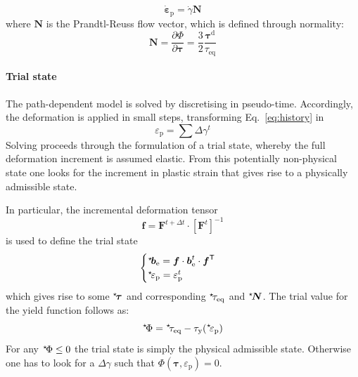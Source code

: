 \documentclass{goose-article}
\newcommand\ST[1]{\hspace*{-.3em}~^\star\!#1}
\newcommand\T[1]{\bm{{#1}}}
\begin{document}
\begin{equation}
  \dot{\bm{\varepsilon}}_\mathrm{p} = \dot{\gamma} \bm{N}
  \label{eq:flow-rule}
\end{equation}
where $\bm{N}$ is the Prandtl-Reuss flow vector, which is defined through normality:
\begin{equation}
  \bm{N}
  = \frac{\partial \Phi}{\partial \T{\tau}}
  = \frac{3}{2} \frac{\T{\tau}^\mathrm{d}}{\tau_\mathrm{eq}}
\end{equation}

\paragraph{Trial state}

The path-dependent model is solved by discretising in pseudo-time. Accordingly, the deformation is applied in small steps, transforming Eq.~\eqref{eq:history} in
\begin{equation}
  \varepsilon_\mathrm{p} = \sum \Delta \gamma^t
\end{equation}
Solving proceeds through the formulation of a trial state, whereby the full deformation increment is assumed elastic. From this potentially non-physical state one looks for the increment in plastic strain that gives rise to a physically admissible state.

In particular, the incremental deformation tensor
\begin{equation}
  \T{f} = \T{F}^{t + \Delta t} \cdot \left[ \T{F}^t \right]^{-1}
\end{equation}
is used to define the trial state
\begin{equation}
  \begin{cases}
    \ST{\T{b}}_\mathrm{e} = \T{f} \cdot \T{b}_\mathrm{e}^t \cdot \T{f}^\mathsf{T}
    \\
    \ST{\varepsilon_\mathrm{p}} = \varepsilon_\mathrm{p}^t
  \end{cases}
\end{equation}
which gives rise to some $\ST{\T{\tau}}$ and corresponding $\ST{\tau}_\mathrm{eq}$ and $\ST{\T{N}}$. The trial value for the yield function follows as:
\begin{equation}
  \ST{\Phi} = \ST{\tau}_\mathrm{eq} - \tau_\mathrm{y}(\ST{\varepsilon}_\mathrm{p})
\end{equation}
For any $\ST{\Phi} \leq 0$ the trial state is simply the physical admissible state. Otherwise one has to look for a $\Delta \gamma$ such that $\Phi(\T{\tau},\varepsilon_\mathrm{p}) = 0$.
\end{document}
